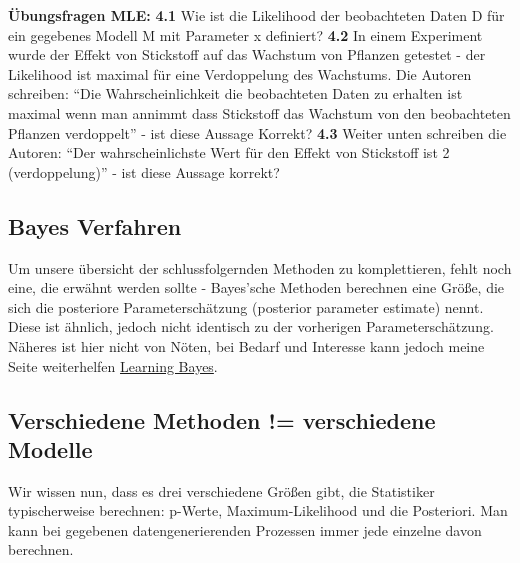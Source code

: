 \documentclass[a4paper,twoside]{tufte-book}\usepackage[]{graphicx}\usepackage[]{color}
\begin{document}
\vspace{1cm}
\begin{fullwidth}
    
\textbf{Übungsfragen MLE:} 
\textbf{4.1} Wie ist die Likelihood der beobachteten Daten D für ein gegebenes Modell M mit Parameter x definiert?
\textbf{4.2} In einem Experiment wurde der Effekt von Stickstoff auf das Wachstum von Pflanzen getestet - der Likelihood ist maximal für eine Verdoppelung des Wachstums. Die Autoren schreiben: “Die Wahrscheinlichkeit die beobachteten Daten zu erhalten ist maximal wenn man annimmt dass Stickstoff das Wachstum von den beobachteten Pflanzen verdoppelt” - ist diese Aussage Korrekt?
\textbf{4.3} Weiter unten schreiben die Autoren: “Der wahrscheinlichste Wert für den Effekt von Stickstoff ist 2 (verdoppelung)” - ist diese Aussage korrekt?

\end{fullwidth}

\subsection{Bayes Verfahren}

Um unsere übersicht der schlussfolgernden Methoden zu komplettieren, fehlt noch eine, die erwähnt werden sollte - Bayes'sche Methoden berechnen eine Größe, die sich die posteriore Parameterschätzung (posterior parameter estimate) nennt. Diese ist ähnlich, jedoch nicht identisch zu der vorherigen Parameterschätzung. Näheres ist hier nicht von Nöten, bei Bedarf und Interesse kann jedoch meine Seite weiterhelfen \citep{Gelman-BayesianDataAnalysis-2003} \href{http://florianhartig.github.io/LearningBayes/}{Learning Bayes}.

\subsection{Verschiedene Methoden != verschiedene Modelle}

Wir wissen nun, dass es drei verschiedene Größen gibt, die Statistiker typischerweise berechnen: p-Werte, Maximum-Likelihood und die Posteriori. Man kann bei gegebenen datengenerierenden Prozessen immer jede einzelne davon berechnen.
\end{document}
